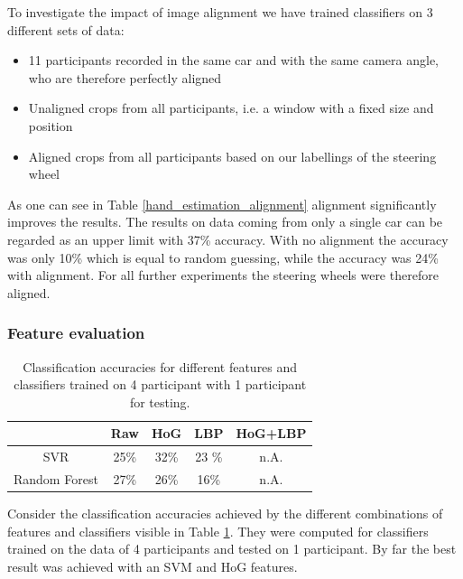 \documentclass[10pt,twocolumn,letterpaper]{article}
\begin{document}
	To investigate the impact of image alignment we have trained classifiers on 3 different sets of data:
	\begin{itemize}
		\item 11 participants recorded in the same car and with the same camera angle, who are therefore perfectly aligned
		\item Unaligned crops from all participants, i.e. a window with a fixed size and position
		\item Aligned crops from all participants based on our labellings of the steering wheel
	\end{itemize}
	As one can see in Table \ref{hand_estimation_alignment} alignment significantly improves the results. The results on data coming from only a single car can be regarded as an upper limit with 37\% accuracy. With no alignment the accuracy was only 10\% which is equal to random guessing, while the accuracy was 24\% with alignment. For all further experiments the steering wheels were therefore aligned.


	\subsubsection{Feature evaluation}
	\begin{table}
		\begin{tabular}{c|c|c|c|c}
			& Raw & HoG & LBP & HoG+LBP \\ 
			\hline 
			SVR & 25\% & 32\% & 23 \% & n.A. \\ 
			\hline 
			Random Forest & 27\% & 26\% & 16\% & n.A. \\ 
		\end{tabular} 
		\caption{Classification accuracies for different features and classifiers trained on 4 participant with 1 participant for testing.}
		\label{hand_estimation_features}
	\end{table}
	Consider the classification accuracies achieved by the different combinations of features and classifiers visible in Table \ref{hand_estimation_features}. They were computed for classifiers trained on the data of 4 participants and tested on 1 participant. By far the best result was achieved with an SVM and HoG features.
	
\end{document}
